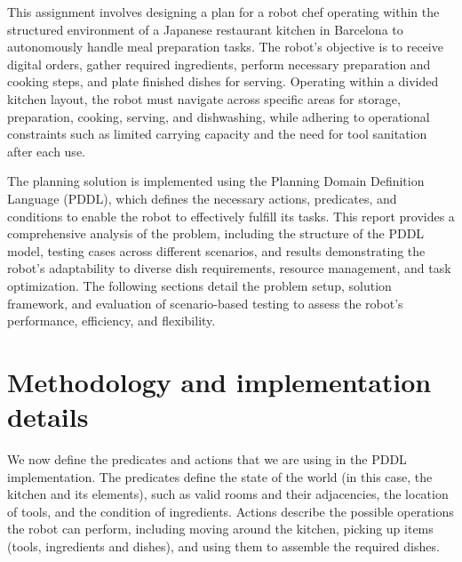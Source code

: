 \documentclass[a4paper,12pt]{article}
\begin{document}
This assignment involves designing a plan for a robot chef operating within the structured environment of a Japanese restaurant kitchen in Barcelona to autonomously handle meal preparation tasks. The robot’s objective is to receive digital orders, gather required ingredients, perform necessary preparation and cooking steps, and plate finished dishes for serving. Operating within a divided kitchen layout, the robot must navigate across specific areas for storage, preparation, cooking, serving, and dishwashing, while adhering to operational constraints such as limited carrying capacity and the need for tool sanitation after each use.

The planning solution is implemented using the Planning Domain Definition Language (PDDL), which defines the necessary actions, predicates, and conditions to enable the robot to effectively fulfill its tasks. This report provides a comprehensive analysis of the problem, including the structure of the PDDL model, testing cases across different scenarios, and results demonstrating the robot’s adaptability to diverse dish requirements, resource management, and task optimization. The following sections detail the problem setup, solution framework, and evaluation of scenario-based testing to assess the robot’s performance, efficiency, and flexibility.

\section{Methodology and implementation details}
\label{sec:methodology}
We now define the predicates and actions that we are using in the PDDL implementation. The predicates define the state of the world (in this case, the kitchen and its elements), such as valid rooms and their adjacencies, the location of tools, and the condition of ingredients. Actions describe the possible operations the robot can perform, including moving around the kitchen, picking up items (tools, ingredients and dishes), and using them to assemble the required dishes.
\end{document}
